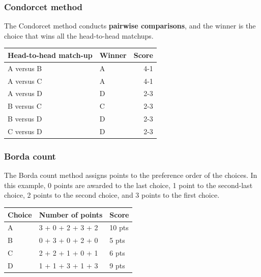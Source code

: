 \documentclass[11pt]{article}
\begin{document}
\subsubsection{Condorcet method}
\label{sec:org0243df6}
The Condorcet method conducts \textbf{pairwise comparisons}, and the winner is the choice that wins all the head-to-head matchups.
\begin{center}
\begin{tabular}{l|l|r}
Head-to-head match-up & Winner & Score\\
\hline
A versus B & A & 4-1\\
A versus C & A & 4-1\\
A versus D & D & 2-3\\
B versus C & C & 2-3\\
B versus D & D & 2-3\\
C versus D & D & 2-3\\
\end{tabular}
\end{center}
\subsubsection{Borda count}
\label{sec:org6994cf1}
The Borda count method assigns points to the preference order of the choices. In this example, 0 points are awarded to the last choice, 1 point to the second-last choice, 2 points to the second choice, and 3 points to the first choice.
\begin{center}
\begin{tabular}{l|l|l}
Choice & Number of points & Score\\
\hline
A & 3 + 0 + 2 + 3 + 2 & 10 pts\\
B & 0 + 3 + 0 + 2 + 0 & 5 pts\\
C & 2 + 2 + 1 + 0 + 1 & 6 pts\\
D & 1 + 1 + 3 + 1 + 3 & 9 pts\\
\end{tabular}
\end{center}

 \newpage
\end{document}
